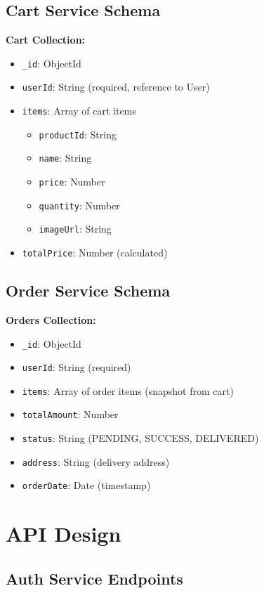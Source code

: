 \subsection{Cart Service Schema}

\textbf{Cart Collection:}
\begin{itemize}
    \item \texttt{\_id}: ObjectId
    \item \texttt{userId}: String (required, reference to User)
    \item \texttt{items}: Array of cart items
    \begin{itemize}
        \item \texttt{productId}: String
        \item \texttt{name}: String
        \item \texttt{price}: Number
        \item \texttt{quantity}: Number
        \item \texttt{imageUrl}: String
    \end{itemize}
    \item \texttt{totalPrice}: Number (calculated)
\end{itemize}

\subsection{Order Service Schema}

\textbf{Orders Collection:}
\begin{itemize}
    \item \texttt{\_id}: ObjectId
    \item \texttt{userId}: String (required)
    \item \texttt{items}: Array of order items (snapshot from cart)
    \item \texttt{totalAmount}: Number
    \item \texttt{status}: String (PENDING, SUCCESS, DELIVERED)
    \item \texttt{address}: String (delivery address)
    \item \texttt{orderDate}: Date (timestamp)
\end{itemize}

\section{API Design}

\subsection{Auth Service Endpoints}

